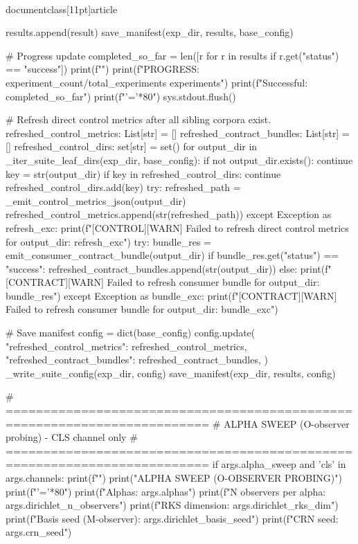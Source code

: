\\documentclass[11pt]{article}
\begin{document}
\begin{CodeBlock}
                results.append(result)
                save_manifest(exp_dir, results, base_config)

                # Progress update
                completed_so_far = len([r for r in results if r.get("status") == "success"])
                print(f"")
                print(f"PROGRESS: {experiment_count}/{total_experiments} experiments")
                print(f"Successful: {completed_so_far}")
                print(f"{'='*80}\n")
                sys.stdout.flush()

    # Refresh direct control metrics after all sibling corpora exist.
    refreshed_control_metrics: List[str] = []
    refreshed_contract_bundles: List[str] = []
    refreshed_control_dirs: set[str] = set()
    for output_dir in _iter_suite_leaf_dirs(exp_dir, base_config):
        if not output_dir.exists():
            continue
        key = str(output_dir)
        if key in refreshed_control_dirs:
            continue
        refreshed_control_dirs.add(key)
        try:
            refreshed_path = _emit_control_metrics_json(output_dir)
            refreshed_control_metrics.append(str(refreshed_path))
        except Exception as refresh_exc:
            print(f"[CONTROL][WARN] Failed to refresh direct control metrics for {output_dir}: {refresh_exc}")
        try:
            bundle_res = emit_consumer_contract_bundle(output_dir)
            if bundle_res.get("status") == "success":
                refreshed_contract_bundles.append(str(output_dir))
            else:
                print(f"[CONTRACT][WARN] Failed to refresh consumer bundle for {output_dir}: {bundle_res}")
        except Exception as bundle_exc:
            print(f"[CONTRACT][WARN] Failed to refresh consumer bundle for {output_dir}: {bundle_exc}")

    # Save manifest
    config = dict(base_config)
    config.update({
        "refreshed_control_metrics": refreshed_control_metrics,
        "refreshed_contract_bundles": refreshed_contract_bundles,
    })
    _write_suite_config(exp_dir, config)
    save_manifest(exp_dir, results, config)

    # =========================================================================
    # ALPHA SWEEP (O-observer probing) - CLS channel only
    # =========================================================================
    if args.alpha_sweep and 'cls' in args.channels:
        print(f"")
        print("ALPHA SWEEP (O-OBSERVER PROBING)")
        print(f"{'='*80}")
        print(f"Alphas: {args.alphas}")
        print(f"N observers per alpha: {args.dirichlet_n_observers}")
        print(f"RKS dimension: {args.dirichlet_rks_dim}")
        print(f"Basis seed (M-observer): {args.dirichlet_basis_seed}")
        print(f"CRN seed: {args.crn_seed}")
        

\end{CodeBlock}
\end{document}
